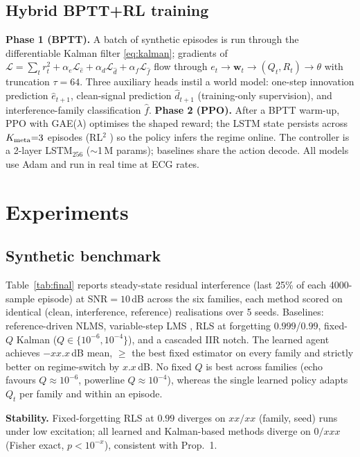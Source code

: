 \documentclass[journal]{IEEEtran}
\newcommand{\pend}[1]{\textcolor{pendingorange}{#1}}
\begin{document}
\subsection{Hybrid BPTT+RL training}
\textbf{Phase 1 (BPTT).} A batch of synthetic episodes is run through the
differentiable Kalman filter \eqref{eq:kalman}; gradients of
$\mathcal{L}=\sum_t r_t^2+\alpha_e\mathcal{L}_{\hat e}+\alpha_d\mathcal{L}_{\hat d}
+\alpha_f\mathcal{L}_{\hat f}$ flow through
$e_t\!\to\!\mathbf{w}_t\!\to\!(Q_t,R_t)\!\to\!\theta$ with truncation
$\tau{=}64$. Three auxiliary heads instil a world model: one-step innovation
prediction $\hat{e}_{t+1}$, clean-signal prediction $\hat{d}_{t+1}$
(training-only supervision), and interference-family classification $\hat{f}$.
\textbf{Phase 2 (PPO).} After a BPTT warm-up, PPO \cite{schulman2017ppo} with
GAE($\lambda$) \cite{schulman2016gae} optimises the shaped reward; the LSTM
state persists across $K_{\rm meta}{=}3$ episodes (RL$^2$
\cite{duan2016rl2,wang2016learning}) so the policy infers the regime online.
The controller is a 2-layer LSTM$_{256}$ ($\sim$1\,M params); baselines share
the action decode. All models use Adam \cite{kingma2014adam} and run in real
time at ECG rates.

\section{Experiments}\label{sec:experiments}

\subsection{Synthetic benchmark}
Table~\ref{tab:final} reports steady-state residual interference (last 25\% of
each 4000-sample episode) at SNR$=10$\,dB across the six families, each method
scored on identical (clean, interference, reference) realisations over 5 seeds.
Baselines: reference-driven NLMS, variable-step LMS \cite{kwong1992variable},
RLS at forgetting $0.999$/$0.99$, fixed-$Q$ Kalman ($Q\!\in\!\{10^{-6},10^{-4}\}$),
and a cascaded IIR notch. The learned agent achieves \pend{$-xx.x$}\,dB mean,
\pend{$\ge$} the best fixed estimator on every family and strictly better on
regime-switch by \pend{$x.x$}\,dB. No fixed $Q$ is best across families (echo
favours $Q\!\approx\!10^{-6}$, powerline $Q\!\approx\!10^{-4}$), whereas the
single learned policy adapts $Q_t$ per family and within an episode.

\smallskip\noindent\textbf{Stability.}
Fixed-forgetting RLS at $0.99$ diverges on \pend{$xx/xx$} (family, seed) runs
under low excitation; all learned and Kalman-based methods diverge on
\pend{$0/xxx$} (Fisher exact, \pend{$p{<}10^{-x}$}), consistent with Prop.~1.
\end{document}
